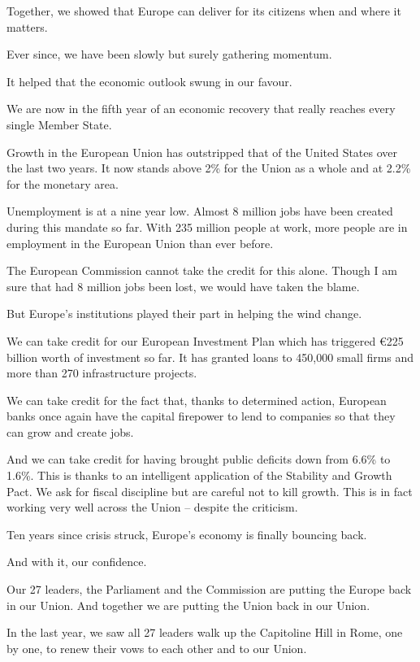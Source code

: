\documentclass[a4paper,11pt]{article}
\begin{document}
Together, we showed that Europe can deliver for its citizens when and where it matters.

Ever since, we have been slowly but surely gathering momentum.

It helped that the economic outlook swung in our favour.

We are now in the fifth year of an economic recovery that really reaches every single Member State.

Growth in the European Union has outstripped that of the United States over the last two years. It now stands above 2\% for the Union as a whole and at 2.2\% for the monetary area.

Unemployment is at a nine year low. Almost 8 million jobs have been created during this mandate so far. With 235 million people at work, more people are in employment in the European Union than ever before.

The European Commission cannot take the credit for this alone. Though I am sure that had 8 million jobs been lost, we would have taken the blame.

But Europe's institutions played their part in helping the wind change.

We can take credit for our European Investment Plan which has triggered \euro225 billion worth of investment so far. It has granted loans to 450,000 small firms and more than 270 infrastructure projects.

We can take credit for the fact that, thanks to determined action, European banks once again have the capital firepower to lend to companies so that they can grow and create jobs.

And we can take credit for having brought public deficits down from 6.6\% to 1.6\%. This is thanks to an intelligent application of the Stability and Growth Pact. We ask for fiscal discipline but are careful not to kill growth. This is in fact working very well across the Union – despite the criticism.

Ten years since crisis struck, Europe's economy is finally bouncing back.

And with it, our confidence.

Our 27 leaders, the Parliament and the Commission are putting the Europe back in our Union. And together we are putting the Union back in our Union.

In the last year, we saw all 27 leaders walk up the Capitoline Hill in Rome, one by one, to renew their vows to each other and to our Union.
\end{document}
